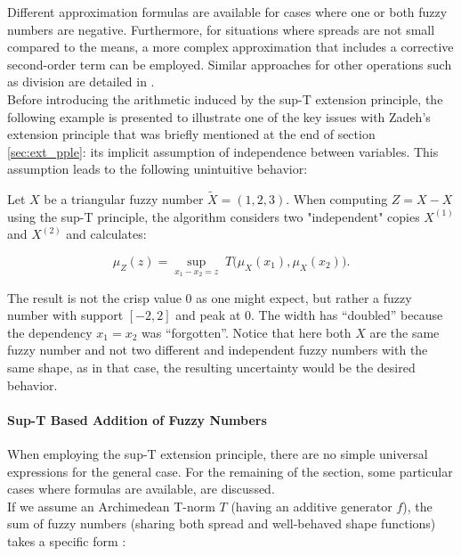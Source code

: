 Different approximation formulas are available for cases where one or both fuzzy numbers are negative. Furthermore, for situations where spreads are not small compared to the means, a more complex approximation that includes a corrective second-order term can be employed. Similar approaches for other operations such as division are detailed in \cite{ApprLRFuzzNum}.\\

Before introducing the arithmetic induced by the sup-T extension principle, the following example is presented to illustrate one of the key issues with Zadeh's extension principle that was briefly mentioned at the end of section \ref{sec:ext_pple}: its implicit assumption of independence between variables. This assumption leads to the following unintuitive behavior:

\begin{example}\label{ex:unc_inflation} 


    Let $X$ be a triangular fuzzy number $\tilde X=(1,2,3)$. When computing $Z=X-X$ using the sup-T principle, the algorithm considers two "independent" copies $X^{(1)}$ and $X^{(2)}$ and calculates:
    
    $$
    \mu_Z(z)=\sup_{x_1-x_2=z}\;T\!\bigl(\mu_{X}(x_1),\mu_{X}(x_2)\bigr).
    $$
    
    The result is not the crisp value 0 as one might expect, but rather a fuzzy number with support $[-2,2]$ and peak at 0. The width has ``doubled'' because the dependency $x_1=x_2$ was ``forgotten''. Notice that here both $X$ are the same fuzzy number and not two different and independent fuzzy numbers with the same shape, as in that case, the resulting uncertainty would be the desired behavior.
    \end{example}

\paragraph{Sup-T Based Addition of Fuzzy Numbers}
When employing the sup-T extension principle, there are no simple universal expressions for the general case. For the remaining of the section, some particular cases where formulas are available, are discussed.\\

If we assume an Archimedean T-norm $T$ (having an additive generator $f$), the sum of fuzzy numbers (sharing both spread and well-behaved shape functions) takes a specific form \cite[Thm. 1.7.1]{FULLER2}:

